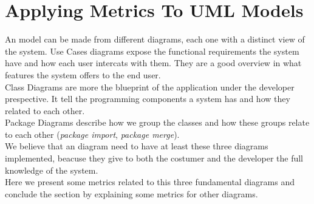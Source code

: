 \section{Applying Metrics To UML Models}\label{metrics}
An \umlS model can be made from different diagrams, each one with a distinct view of the system. Use Cases diagrams expose
the functional requirements the system have and how each user intercats with them. They are a good overview in what
features the system offers to the end user.\\
Class Diagrams are more the blueprint of the application under the developer prespective. It tell the programming components a system has and
how they related to each other.\\
Package Diagrams describe how we group the classes and how these groups relate to each other (\textit{package import}, \textit{package merge}).\\
\indent We believe that an \umlS diagram need to have at least these three diagrams implemented, beacuse they give to both the costumer and the developer
the full knowledge of the system.\\
\indent Here we present some metrics related to this three fundamental diagrams and conclude the section by explaining some metrics for other \umlS diagrams.

